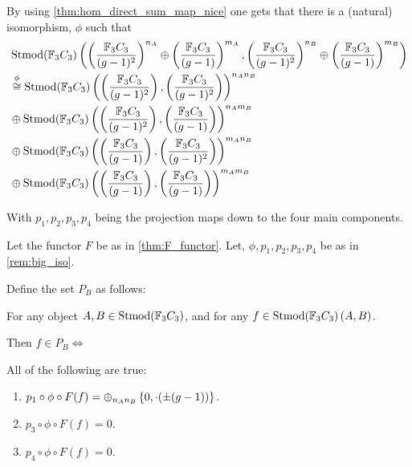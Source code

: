 \begin{remark} \label{rem:big_iso}
    By using \autoref{thm:hom_direct_sum_map_nice} one gets that there is a (natural) isomorphism, \( \phi \) such that
    \begin{align*}
        &\operatorname{Stmod}({\mathbb{F}}_3C_3)\left(\left( \frac{{\mathbb{F}}_3C_3}{(g - 1)^2} \right)^{n_A} \oplus \left( \frac{{\mathbb{F}}_3C_3}{(g - 1)} \right)^{m_A}, \left( \frac{{\mathbb{F}}_3C_3}{(g - 1)^2} \right)^{n_B} \oplus \left( \frac{{\mathbb{F}}_3C_3}{(g - 1)} \right)^{m_B}\right) \\
        &\stackrel{\phi}{\cong} \operatorname{Stmod}({\mathbb{F}}_3C_3)\left( \left( \frac{{\mathbb{F}}_3C_3}{(g - 1)^2} \right), \left( \frac{{\mathbb{F}}_3C_3}{(g - 1)^2} \right) \right)^{n_An_B} \\
        &\oplus \operatorname{Stmod}({\mathbb{F}}_3C_3)\left( \left( \frac{{\mathbb{F}}_3C_3}{(g - 1)^2} \right), \left( \frac{{\mathbb{F}}_3C_3}{(g - 1)} \right) \right)^{n_Am_B} \\
        &\oplus \operatorname{Stmod}({\mathbb{F}}_3C_3)\left( \left( \frac{{\mathbb{F}}_3C_3}{(g - 1)} \right), \left( \frac{{\mathbb{F}}_3C_3}{(g - 1)^2} \right) \right)^{m_An_B} \\
        &\oplus \operatorname{Stmod}({\mathbb{F}}_3C_3)\left( \left( \frac{{\mathbb{F}}_3C_3}{(g - 1)} \right), \left( \frac{{\mathbb{F}}_3C_3}{(g - 1)} \right) \right)^{m_Am_B}
    \end{align*}

    With \( p_1, p_2, p_3, p_4 \) being the projection maps down to the four main components.
\end{remark}

\begin{definition} %
    Let the functor \( F \) be as in \autoref{thm:F_functor}.  Let, \( \phi, p_1, p_2, p_3, p_4 \) be as in \autoref{rem:big_iso}.

    Define the set \( P_B \) as follows:

    For any object \( A, B \in \operatorname{Stmod}({\mathbb{F}}_3C_3) \), and for any \( f \in \operatorname{Stmod}({\mathbb{F}}_3C_3)\left(A, B\right) \).

    Then \( f \in P_B \iff \)

    All of the following are true:
    \begin{enumerate}
        \item {
            \( p_1 \circ \phi \circ F(f) = \oplus_{n_An_B} \left\{0, \cdot(\pm (g - 1))\right\} \).
        }
        \item {
            \( p_3 \circ \phi \circ F(f) = 0 \).
        }
        \item {
            \( p_4 \circ \phi \circ F(f) = 0 \).
        }
    \end{enumerate}
\end{definition}

